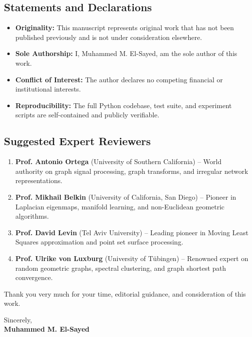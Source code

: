 \documentclass[11pt,a4paper]{article}
\begin{document}
\subsection*{Statements and Declarations}
\begin{itemize}
    \item \textbf{Originality:} This manuscript represents original work that has not been published previously and is not under consideration elsewhere.
    \item \textbf{Sole Authorship:} I, Muhammed M. El-Sayed, am the sole author of this work.
    \item \textbf{Conflict of Interest:} The author declares no competing financial or institutional interests.
    \item \textbf{Reproducibility:} The full Python codebase, test suite, and experiment scripts are self-contained and publicly verifiable.
\end{itemize}

\subsection*{Suggested Expert Reviewers}
\begin{enumerate}
    \item \textbf{Prof. Antonio Ortega} (University of Southern California) -- World authority on graph signal processing, graph transforms, and irregular network representations.
    \item \textbf{Prof. Mikhail Belkin} (University of California, San Diego) -- Pioneer in Laplacian eigenmaps, manifold learning, and non-Euclidean geometric algorithms.
    \item \textbf{Prof. David Levin} (Tel Aviv University) -- Leading pioneer in Moving Least Squares approximation and point set surface processing.
    \item \textbf{Prof. Ulrike von Luxburg} (University of T{\"u}bingen) -- Renowned expert on random geometric graphs, spectral clustering, and graph shortest path convergence.
\end{enumerate}

Thank you very much for your time, editorial guidance, and consideration of this work.

\vspace{2em}

\noindent
Sincerely,\\
\textbf{Muhammed M. El-Sayed}
\end{document}
